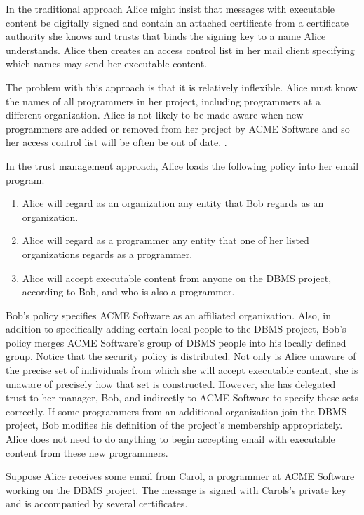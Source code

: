 \documentclass{article}
\begin{document}
In the traditional approach Alice might insist that messages with
executable content be digitally signed and contain an attached certificate
from a certificate authority she knows and trusts that binds the signing
key to a name Alice understands. Alice then creates an access control list
in her mail client specifying which names may send her executable content.

The problem with this approach is that it is relatively inflexible. Alice
must know the names of all programmers in her project, including
programmers at a different organization. Alice is not likely to be made
aware when new programmers are added or removed from her project by ACME
Software and so her access control list will be often be out of date.
.

In the trust management approach, Alice loads the following policy into her
email program.

\begin{enumerate}
\item Alice will regard as an organization any entity that Bob regards as
  an organization.

\item Alice will regard as a programmer any entity that one of her listed
  organizations regards as a programmer.

\item Alice will accept executable content from anyone on the DBMS project,
  according to Bob, and who is also a programmer.
\end{enumerate}

Bob's policy specifies ACME Software as an affiliated organization. Also,
in addition to specifically adding certain local people to the DBMS
project, Bob's policy merges ACME Software's group of DBMS people into his
locally defined group. Notice that the security policy is distributed. Not
only is Alice unaware of the precise set of individuals from which she will
accept executable content, she is unaware of precisely how that set is
constructed. However, she has delegated trust to her manager, Bob, and
indirectly to ACME Software to specify these sets correctly. If some
programmers from an additional organization join the DBMS project, Bob
modifies his definition of the project's membership appropriately. Alice
does not need to do anything to begin accepting email with executable
content from these new programmers.

Suppose Alice receives some email from Carol, a programmer at ACME Software
working on the DBMS project. The message is signed with Carols's private
key and is accompanied by several certificates.
\end{document}

